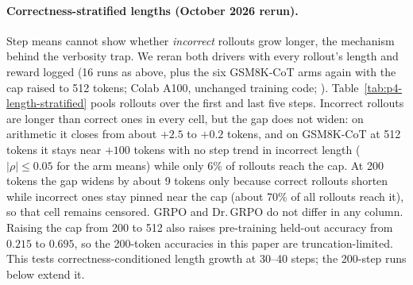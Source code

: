 \paragraph{Correctness-stratified lengths (October 2026 rerun).}
Step means cannot show whether \emph{incorrect} rollouts grow longer, the
mechanism behind the verbosity trap. We reran both drivers with every
rollout's length and reward logged (16 runs as above, plus the six GSM8K-CoT
arms again with the cap raised to 512 tokens; Colab A100, unchanged training
code; ).
Table~\ref{tab:p4-length-stratified} pools rollouts over the first and last
five steps. Incorrect rollouts are longer than correct ones in every cell, but
the gap does not widen: on arithmetic it closes from about $+2.5$ to $+0.2$
tokens, and on GSM8K-CoT at 512 tokens it stays near $+100$ tokens with no step
trend in incorrect length ($|\rho|\le0.05$ for the arm means) while only 6\% of
rollouts reach the cap. At 200 tokens the gap widens by about 9 tokens only
because correct rollouts shorten while incorrect ones stay pinned near the cap
(about 70\% of all rollouts reach it), so that cell remains censored. GRPO and Dr.\,GRPO do
not differ in any column. Raising the cap from 200 to 512 also raises
pre-training held-out accuracy from $0.215$ to $0.695$, so the 200-token
accuracies in this paper are truncation-limited. This tests correctness-conditioned
length growth at 30--40 steps; the 200-step runs below extend it.

